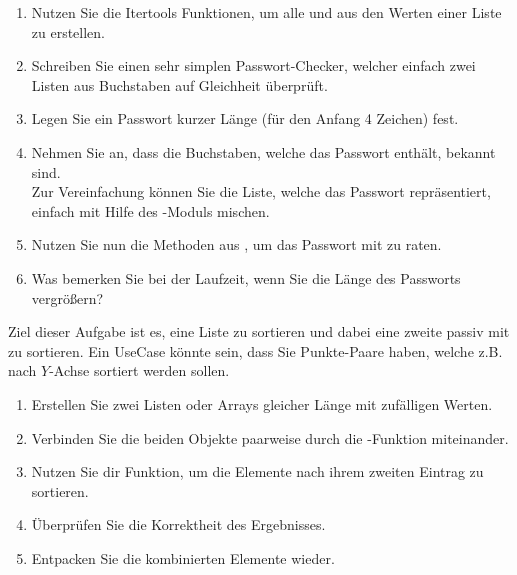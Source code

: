 \documentclass{ubo_tex_uebungszettel/uebungszettel}
\theoremstyle{definition}
\newcommand{\pp}[1]{\lpl{#1}}
\begin{document}
 \begin{enumerate}
 	\item Nutzen Sie die Itertools Funktionen, um alle  und  aus den Werten einer Liste zu erstellen.
 	
 	\item Schreiben Sie einen sehr simplen \glqq Passwort-Checker\grqq, welcher einfach zwei Listen aus Buchstaben auf Gleichheit überprüft.
 	
 	\item Legen Sie ein Passwort \textsf{kurzer} Länge (für den Anfang 4 Zeichen) fest.
 	
 	\item Nehmen Sie an, dass die Buchstaben, welche das Passwort enthält, bekannt sind.\\
 	Zur Vereinfachung können Sie die Liste, welche das Passwort repräsentiert, einfach mit Hilfe des \pp{random}-Moduls mischen.
 	
 	\item Nutzen Sie nun die Methoden aus \pp{Itertools}, um das Passwort mit  zu raten.
 	
 	\item Was bemerken Sie bei der Laufzeit, wenn Sie die Länge des Passworts vergrößern?
 	
 \end{enumerate}	
 
 
\pagebreak

     \noindent {} \quad
     Ziel dieser Aufgabe ist es, eine Liste zu sortieren und dabei eine zweite \glqq passiv\grqq \; mit zu sortieren. Ein UseCase könnte sein, dass Sie Punkte-Paare haben, welche z.B. nach $Y$-Achse sortiert werden sollen.

\begin{enumerate}
	\item Erstellen Sie zwei Listen oder Arrays gleicher Länge mit zufälligen Werten.
	
	\item Verbinden Sie die beiden Objekte paarweise durch die \pp{zip}-Funktion miteinander.
	
	\item Nutzen Sie dir \pp{sorted} Funktion, um die Elemente nach ihrem zweiten Eintrag zu sortieren.
	
	\item Überprüfen Sie die Korrektheit des Ergebnisses.
	
	\item Entpacken Sie die kombinierten Elemente wieder.

\end{enumerate}
\end{document}
